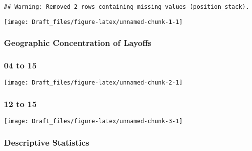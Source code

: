 \documentclass[
  12pt,
]{article}
\begin{document}
\begin{verbatim}
## Warning: Removed 2 rows containing missing values (position_stack).
\end{verbatim}

\texttt{[image: Draft\_files/figure-latex/unnamed-chunk-1-1]}

\newpage

\hypertarget{geographic-concentration-of-layoffs}{%
\subsubsection{Geographic Concentration of
Layoffs}\label{geographic-concentration-of-layoffs}}

\hypertarget{to-15}{%
\subsubsection{04 to 15}\label{to-15}}

\texttt{[image: Draft\_files/figure-latex/unnamed-chunk-2-1]}

\newpage

\hypertarget{to-15-1}{%
\subsubsection{12 to 15}\label{to-15-1}}

\texttt{[image: Draft\_files/figure-latex/unnamed-chunk-3-1]}

\newpage

\hypertarget{descriptive-statistics}{%
\subsubsection{Descriptive Statistics}\label{descriptive-statistics}}

\begin{table}[!h]

\caption{\label{tab:unnamed-chunk-4}Manufacturing Job Changes 2004-2015}
\centering
{}
\end{table}
\end{document}
